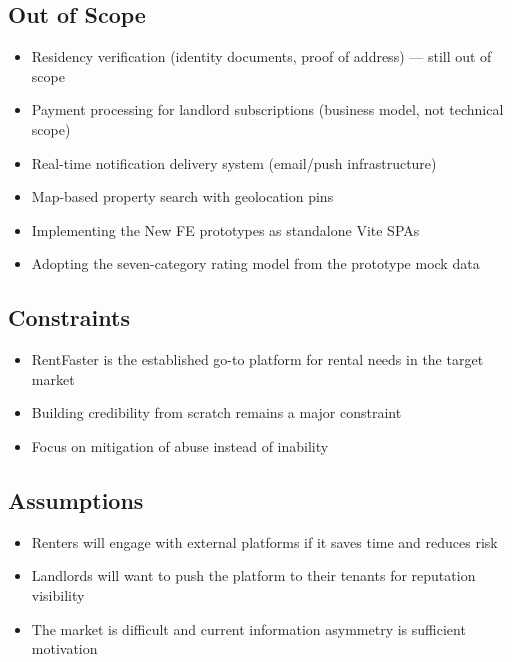 \documentclass[11pt,letterpaper]{article}
\begin{document}
\subsection{Out of Scope}

\begin{itemize}
    \item Residency verification (identity documents, proof of address) --- still out of scope
    \item Payment processing for landlord subscriptions (business model, not technical scope)
    \item Real-time notification delivery system (email/push infrastructure)
    \item Map-based property search with geolocation pins
    \item Implementing the New FE prototypes as standalone Vite SPAs
    \item Adopting the seven-category rating model from the prototype mock data
\end{itemize}

\subsection{Constraints}

\begin{itemize}
    \item RentFaster is the established go-to platform for rental needs in the target market
    \item Building credibility from scratch remains a major constraint
    \item Focus on mitigation of abuse instead of inability
\end{itemize}

\subsection{Assumptions}

\begin{itemize}
    \item Renters will engage with external platforms if it saves time and reduces risk
    \item Landlords will want to push the platform to their tenants for reputation visibility
    \item The market is difficult and current information asymmetry is sufficient motivation
\end{itemize}

\end{document}
